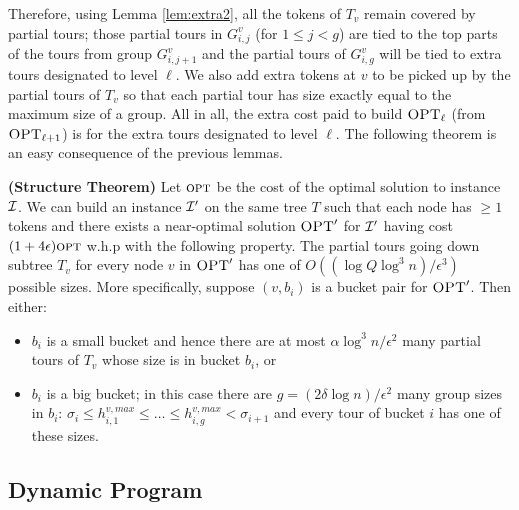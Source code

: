 \documentclass[twoside,leqno]{article}
\newcommand{\calI}{{\cal I}}
\newcommand{\opt}{\mbox{\sc opt}}
\newcommand{\OPT}{\mbox{\sc OPT}}
\newcommand{\eps}{\epsilon}
\begin{document}
Therefore, using Lemma \ref{lem:extra2}, all the tokens of $T_v$ remain covered by partial tours;
those partial tours in $G^v_{i,j}$ (for $1\leq j<g$) are tied to the top parts of the tours from group $G^v_{i,j+1}$ and the
partial tours of $G^v_{i,g}$ will be tied to extra tours designated to level $\ell$. We also add extra tokens at $v$ to be
picked up by the partial tours of $T_v$ so that each partial tour has size exactly equal to the maximum size of a group.
All in all, the extra cost paid to build $\OPT_\ell$ (from $\OPT_{\ell+1}$) is for the extra tours designated to level $\ell$.
The following theorem is an easy consequence of the previous lemmas.

\begin{theorem}\label{lem:struct1} \textbf{(Structure Theorem)}
Let $\opt$ be the cost of the optimal solution to instance $\calI$. We can build an instance $\calI'$ on the same tree $T$
such that each node has $\geq 1$ tokens and there exists a near-optimal solution $\OPT'$ for $\calI'$
having cost $(1 + 4\eps)\opt$ w.h.p with the following property.
The partial tours going down subtree $T_v$ for every node $v$ in $\OPT'$ has one of $O((\log Q \log^3 n)/\eps^3)$ possible sizes.
More specifically, suppose $(v,b_i)$ is a bucket pair for $\OPT'$. Then either:
\begin{itemize}
\item $b_i$ is a small bucket and hence there are at most $\alpha \log^3 n/\eps^2$ many partial tours of $T_v$ whose size is in bucket $b_i$, or
\item $b_i$ is a big bucket; in this case there are $g = (2\delta \log n)/\eps^2 $ many group sizes in $b_i$:
$\sigma_i \leq h^{v,max}_{i,1}\leq \ldots\leq h^{v,max}_{i,g}<\sigma_{i+1}$ and every tour of bucket $i$ has one of these sizes.
\end{itemize}
\end{theorem}


\subsection{Dynamic Program}
\end{document}
